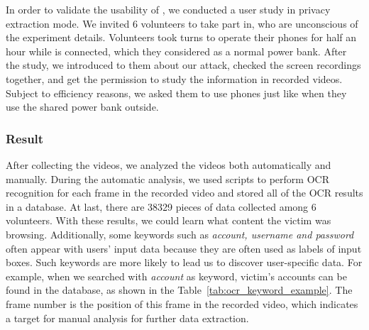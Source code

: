 In order to validate the usability of \tool, we conducted a user study in privacy extraction mode.
We invited 6 volunteers to take part in, who are unconscious of the experiment details.
Volunteers took turns to operate their phones for half an hour while \tool is connected, which they considered as a normal power bank.
After the study, we introduced to them about our attack, checked the screen recordings together, and get the permission to study the information in recorded videos.
Subject to efficiency reasons, we asked them to use phones just like when they use the shared power bank outside.


\subsubsection{Result}

After collecting the videos, we analyzed the videos both automatically and manually.
During the automatic analysis, we used scripts to perform OCR recognition for each frame in the recorded video and stored all of the OCR results in a database.
At last, there are 38329 pieces of data collected among 6 volunteers.
With these results, we could learn what content the victim was browsing.
Additionally, some keywords such as \textit{account, username and password} often appear with users' input data because they are often used as labels of input boxes.
Such keywords are more likely to lead us to discover user-specific data.
For example, when we searched with \textit{account} as keyword, victim's accounts can be found in the database, as shown in the Table~\ref{tab:ocr_keyword_example}.
The frame number is the position of this frame in the recorded video, which indicates a target for manual analysis for further data extraction.


